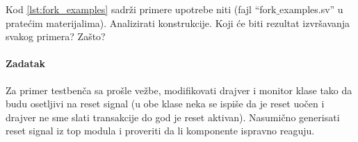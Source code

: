 Kod \ref{lst:fork_examples} sadrži primere upotrebe niti (fajl
``fork\(\_\)examples.sv'' u pratećim materijalima).
Analizirati konstrukcije.
Koji će biti rezultat izvršavanja svakog primera?
Zašto?



\paragraph{Zadatak}

Za primer testbenča sa prošle vežbe, modifikovati drajver i monitor klase tako
da budu osetljivi na reset signal (u obe klase neka se ispiše da je reset uočen
i drajver ne sme slati transakcije do god je reset aktivan). Nasumično
generisati reset signal iz top modula i proveriti da li komponente ispravno
reaguju.

